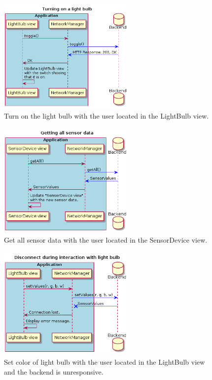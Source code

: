 \documentclass[a4paper]{article}
\begin{document}
\begin{figure}[H]
    \centering
    \includegraphics[width=0.6\textwidth]{seq1.png}
    \caption{Turn on the light bulb with the user located in the LightBulb view.}
    \label{fig:seq1}
\end{figure}

\begin{figure}[H]
    \centering
    \includegraphics[width=0.6\textwidth]{seq2.png}
    \caption{Get all sensor data with the user located in the SensorDevice view.}
    \label{fig:seq2}
\end{figure}

\begin{figure}[H]
    \centering
    \includegraphics[width=0.6\textwidth]{seq3.png}
    \caption{Set color of light bulb with the user located in the LightBulb view and the backend is unresponsive.}
    \label{fig:seq3}
\end{figure}
	
\end{document}
